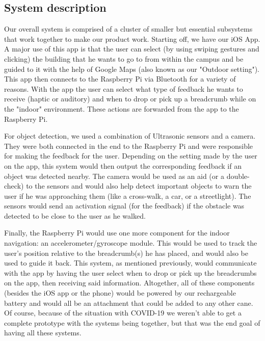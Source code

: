 \documentclass[letterpaper,12pt]{article}
\begin{document}

\subsection{System description}
Our overall system is comprised of a cluster of smaller but essential subsystems that work together to make our product work. Starting off, we have our iOS App. A major use of this app is that the user can select (by using swiping gestures and clicking) the building that he wants to go to from within the campus and be guided to it with the help of Google Maps (also known as our "Outdoor setting"). This app then connects to the Raspberry Pi via Bluetooth for a variety of reasons. With the app the user can select what type of feedback he wants to receive (haptic or auditory) and when to drop or pick up a breadcrumb while on the "indoor" environment. These actions are forwarded from the app to the Raspberry Pi. \par

For object detection, we used a combination of Ultrasonic sensors and a camera. They were both connected in the end to the Raspberry Pi and were responsible for making the feedback for the user. Depending on the setting made by the user on the app, this system would then output the corresponding feedback if an object was detected nearby. The camera would be used as an aid (or a double-check) to the sensors and would also help detect important objects to warn the user if he was approaching them (like a cross-walk, a car, or a streetlight). The sensors would send an activation signal (for the feedback) if the obstacle was detected to be close to the user as he walked.\par

Finally, the Raspberry Pi would use one more component for the indoor navigation: an accelerometer/gyroscope module. This would be used to track the user's position relative to the breadcrumb(s) he has placed, and would also be used to guide it back. This system, as mentioned previously, would communicate with the app by having the user select when to drop or pick up the breadcrumbs on the app, then receiving said information. Altogether, all of these components (besides the iOS app or the phone) would be powered by our rechargeable battery and would all be an attachment that could be added to any other cane. Of course, because of the situation with COVID-19 we weren't able to get a complete prototype with the systems being together, but that was the end goal of having all these systems.
\end{document}
